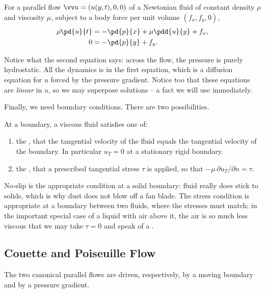 \begin{proposition}
	For a parallel flow $\vv u = (u(y, t), 0, 0)$ of a Newtonian fluid of constant density $\rho$ and viscosity $\mu$, subject to a body force per unit volume $(f_x, f_y, 0)$,
	\begin{align*}
		\rho \pd{u}{t} &= -\pd{p}{x} + \mu \pdd{u}{y} + f_x, \\
		0 &= - \pd{p}{y} + f_y.
	\end{align*}
\end{proposition}

Notice what the second equation says: across the flow, the pressure is purely hydrostatic. All the dynamics is in the first equation, which is a diffusion equation for $u$ forced by the pressure gradient. Notice too that these equations are \emph{linear} in $u$, so we may superpose solutions -- a fact we will use immediately.

Finally, we need boundary conditions. There are two possibilities.

\begin{definition}
	At a boundary, a viscous fluid satisfies one of:
	\begin{enumerate}[label=(\roman*)]
		\item the , that the tangential velocity of the fluid equals the tangential velocity of the boundary. In particular $u_T = 0$ at a stationary rigid boundary.
		\item the , that a prescribed tangential stress $\tau$ is applied, so that $-\mu \, \partial u_T/\partial n = \tau$.
	\end{enumerate}
\end{definition}

No-slip is the appropriate condition at a solid boundary: fluid really does stick to solids, which is why dust does not blow off a fan blade. The stress condition is appropriate at a boundary between two fluids, where the stresses must match; in the important special case of a liquid with air above it, the air is so much less viscous that we may take $\tau = 0$ and speak of a .

\subsection{Couette and Poiseuille Flow}

The two canonical parallel flows are driven, respectively, by a moving boundary and by a pressure gradient.

